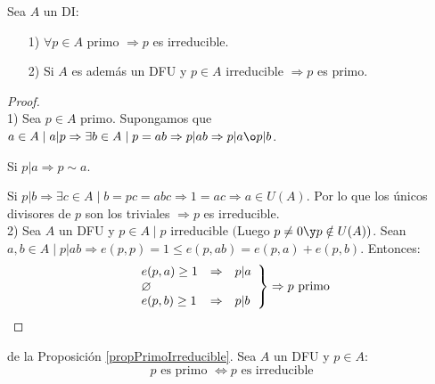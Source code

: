 \begin{prop}
    \label{propPrimoIrreducible}
    Sea $A$ un DI:
    \begin{enumerate}
        \item[1)] $\forall p \in A$ primo $\Rightarrow p$ es irreducible.
        \item[2)] Si $A$ es además un DFU y $p \in A$ irreducible $\Rightarrow p$ es primo.
    \end{enumerate}
\begin{proof}
    \ \\
    1) Sea $p \in A$ primo.\newline
    Supongamos que $a \in A \mid a|p \Rightarrow \exists b \in A \mid p=ab \Rightarrow p|ab \Rightarrow p|a \o p|b$.\par
    Si $p|a \Rightarrow p\sim a$.\par
    Si $p|b \Rightarrow \exists c \in A \mid b=pc =abc \Rightarrow 1=ac \Rightarrow a \in U(A)$.\newline
    Por lo que los únicos divisores de $p$ son los triviales $\Rightarrow p$ es irreducible.\\

    
    2) Sea $A$ un DFU y $p \in A \mid p$ irreducible $($Luego $p\neq 0 \y p \notin U(A))$.\newline
    Sean $a,b \in A \mid p|ab \Rightarrow e(p,p)=1\leq e(p,ab) = e(p,a)+e(p,b)$. Entonces:
    $$\left. \begin{array}{lll}
            e(p,a) \geq 1 & \Rightarrow & p|a \\
            \o            &             &     \\
            e(p,b) \geq 1 & \Rightarrow & p|b
        \end{array} \right\} \Rightarrow p \mbox{ primo}$$
\end{proof}
\end{prop}


\begin{coro}
    de la Proposición \ref{propPrimoIrreducible}.\newline
    Sea $A$ un DFU y $p \in A$:
    $$p \mbox{ es primo } \Leftrightarrow p \mbox{ es irreducible}$$
\end{coro}

